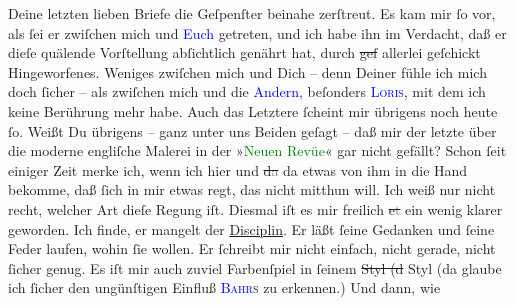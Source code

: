 \documentclass[twoside=false,titlepage=false,open=any, parskip=never, fontsize=12pt, headings=small, chapterprefix=false, appendixprefix=false]{scrbook}
\newcommand{\strikeout}[1]{\sout{#1}}
\newcommand{\pbposition}{\depth}
\newcommand{\pb}{\nobreak\hspace{0pt}\raisebox{-0.1em}{\raisebox{\pbposition}{\textnormal{|}}}\nobreak\hspace{0pt}}
\begin{document}
               Deine letzten lieben Briefe die Geſpenſter beinahe zerſtreut. Es kam mir ſo vor, als
               ſei er zwiſchen mich und \textcolor{blue}{Euch}{} getreten, und ich habe ihn im
               Verdacht, daß er dieſe quälende Vorſtellung abſichtlich genährt hat, durch \strikeout{geſ} allerlei geſchickt Hingeworfenes. Weniges zwiſchen
               mich und Dich – denn Deiner fühle {\pb}ich mich doch
               ſicher – als zwiſchen mich und die \textcolor{blue}{Andern}{}, beſonders \textsc{\textcolor{blue}{Loris}{}\ledrightnote{\textcolor{blue}{Hugo von Hofmannsthal}}}, mit dem ich keine Berührung mehr habe. Auch das Letztere ſcheint mir übrigens
               noch heute ſo.\pend
           \pstart
           Weißt Du übrigens – ganz unter uns Beiden geſagt – daß mir der letzte \label{K_L02627-44v}\label{K_L02627-44h} über die moderne engliſche Malerei in der »\textcolor{green}{Neuen Revüe}{}\ledrightnote{\textcolor{green}{Neue Revue. Wiener Literatur-Zeitung}}« gar nicht gefällt? Schon ſeit
               einiger Zeit merke ich, wenn ich hier und \strikeout{d\textcolor{gray}{a}} da etwas von ihm in die Hand bekomme, daß ſich in mir etwas regt, das nicht
               mitthun will. Ich weiß nur nicht {\pb}recht, welcher Art
               dieſe Regung iſt. Diesmal iſt es mir freilich \strikeout{e\textcolor{gray}{t}}\textcolor{gray}{} ein wenig klarer geworden. Ich finde, er mangelt der \uline{Disciplin}. Er läßt ſeine Gedanken und ſeine Feder laufen, wohin ſie
               wollen. Er ſchreibt mir nicht einfach, nicht gerade, nicht ſicher genug. Es iſt mir
               auch zuviel Farbenſpiel in ſeinem \strikeout{Styl (d} Styl (da
               glaube ich ſicher den ungünſtigen Einfluß \textsc{\textcolor{blue}{Bahr}{}\ledrightnote{\textcolor{blue}{Hermann Bahr}}s} zu erkennen.) Und dann, wie
\end{document}

